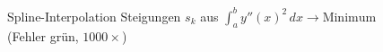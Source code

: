 \begin{frame}[t]
\begin{columns}[t,onlytextwidth]
\begin{column}{0.36\textwidth}
\begin{block}{Spline-Interpolation}
Steigungen $s_k$ aus %
$\int_a^b y''(x)^2\,dx\to\text{Minimum}$
\\[5pt]
(Fehler {\color{darkgreen}grün}, $1000 \times$)
\end{block}
\vspace*{-2pt}
\end{column}
\end{columns}
\end{frame}
\egroup
